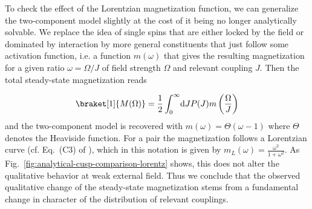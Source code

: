To check the effect of the Lorentzian magnetization function, we can generalize the two-component model slightly at the cost of it being no longer analytically solvable. We replace the idea of single spins that are either locked by the field or dominated by interaction by more general constituents that just follow some activation function, i.e. a function $m(\omega)$ that gives the resulting magnetization for a given ratio $\omega=\Omega/J$ of field strength $\Omega$ and relevant coupling $J$. Then the total steady-state magnetization reads

\begin{equation}\label{eq:generalized-two-component-model}
	\braket[1]{M(\Omega)} = \frac{1}{2}\int_0^{\infty}\!\mathrm{d}J P(J)m\left(\frac{\Omega}{J}\right)
\end{equation}
and the two-component model is recovered with $m(\omega)=\Theta(\omega - 1)$ where $\Theta$ denotes the Heaviside function. For a pair the magnetization follows a Lorentzian curve (cf. Eq.~(C3) of \cite{franzEmergentPairLocalization2022}), which in this notation is given by $m_L(\omega) = \frac{\omega^2}{1+\omega^2}$. As Fig.~\ref{fig:analytical-cusp-comparison-lorentz} shows, this does not alter the qualitative behavior at weak external field. Thus we conclude that the observed qualitative change of the steady-state magnetization stems from a fundamental change in character of the distribution of relevant couplings.

%
%
%
%



